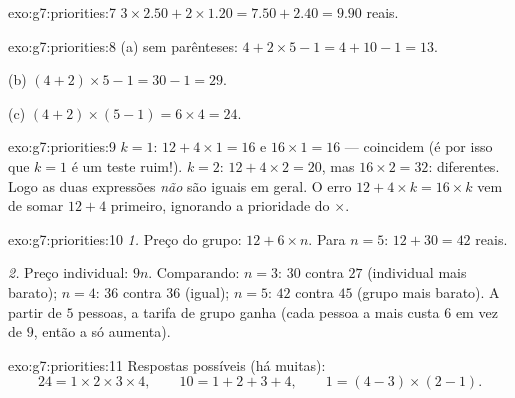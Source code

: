 \begin{solution}{exo:g7:priorities:7}
$3 \times 2.50 + 2 \times 1.20 = 7.50 + 2.40 = 9.90$ reais.
\end{solution}

\begin{solution}{exo:g7:priorities:8}
(a) sem parênteses: $4 + 2 \times 5 - 1 = 4 + 10 - 1 = 13$.

(b) $(4 + 2) \times 5 - 1 = 30 - 1 = 29$.

(c) $(4 + 2) \times (5 - 1) = 6 \times 4 = 24$.
\end{solution}

\begin{solution}{exo:g7:priorities:9}
$k = 1$: $12 + 4 \times 1 = 16$ e $16 \times 1 = 16$ --- coincidem (é
por isso que $k = 1$ é um teste ruim!). $k = 2$:
$12 + 4 \times 2 = 20$, mas $16 \times 2 = 32$: diferentes. Logo as
duas expressões \emph{não} são iguais em geral. O erro
$12 + 4 \times k = 16 \times k$ vem de somar $12 + 4$ primeiro,
ignorando a prioridade do $\times$.
\end{solution}

\begin{solution}{exo:g7:priorities:10}
\emph{1.} Preço do grupo: $12 + 6 \times n$. Para $n = 5$:
$12 + 30 = 42$ reais.

\emph{2.} Preço individual: $9n$. Comparando: $n = 3$: $30$ contra
$27$ (individual mais barato); $n = 4$: $36$ contra $36$ (igual);
$n = 5$: $42$ contra $45$ (grupo mais barato). A partir de $5$ pessoas,
a tarifa de grupo ganha (cada pessoa a mais custa $6$ em vez de $9$,
então a  só aumenta).
\end{solution}

\begin{solution}{exo:g7:priorities:11}
Respostas possíveis (há muitas):
\[
24 = 1 \times 2 \times 3 \times 4, \qquad
10 = 1 + 2 + 3 + 4, \qquad
1 = (4 - 3) \times (2 - 1).
\]
\end{solution}

